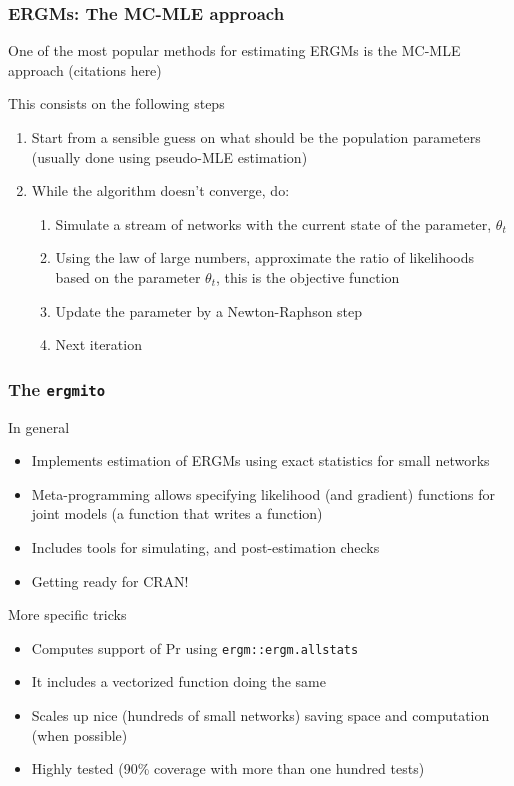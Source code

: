 \documentclass[aspectratio=169, 9pt]{beamer}\usepackage[]{graphicx}\usepackage[]{color}
\newcommand{\ergmitopkg}[0]{\texttt{ergmito}}
\begin{document}
\begin{frame}[label=mcmle]
\frametitle{ERGMs: The MC-MLE approach}

One of the most popular methods for estimating ERGMs is the MC-MLE approach (citations here)

This consists on the following steps

\begin{enumerate}
\item Start from a sensible guess on what should be the population parameters
(usually done using pseudo-MLE estimation)
\item While the algorithm doesn't converge, do:
  \begin{enumerate}
  \item Simulate a stream of networks with the current state of the parameter,
  $\theta_t$
  \item Using the law of large numbers, approximate the ratio of likelihoods 
  based on the parameter $\theta_t$, this is the objective function
  \item Update the parameter by a Newton-Raphson step
  \item Next iteration
  \end{enumerate}
\end{enumerate}

\vfill\hfill \hyperlink{art}{}


\end{frame}

\begin{frame}[label=ergmitopkg]
\frametitle{The \ergmitopkg{}}

In general

\begin{itemize}
\item Implements estimation of ERGMs using exact statistics for small networks
\item Meta-programming allows specifying likelihood (and gradient) functions for
joint models (a function that writes a function)
\item Includes tools for simulating, and post-estimation checks
\item Getting ready for CRAN!
\end{itemize}

More specific tricks

\begin{itemize}
\item Computes support of Pr using \texttt{ergm::ergm.allstats}
\item It includes a vectorized function doing the same
\item Scales up nice (hundreds of small networks) saving space and computation (when possible)
\item Highly tested (90\% coverage with more than one hundred tests)
\end{itemize}

\vfill\hfill \hyperlink{ergmito}{}

\end{frame}
\end{document}
